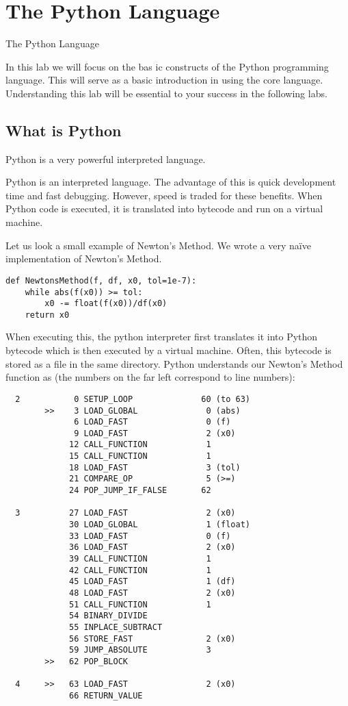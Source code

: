 \chapter{The Python Language}{The Python Language}
\label{Lab:PythonBasic}

In this lab we will focus on the bas ic constructs of the Python programming language.  This will serve as a basic introduction in using the core language.  Understanding this lab will be essential to your success in the following labs.

\section*{What is Python}
Python is a very powerful interpreted language.  

Python is an interpreted language.  The advantage of this is quick development time and fast debugging.  However, speed is traded for these benefits.  When Python code is executed, it is translated into bytecode and run on a virtual machine.

Let us look a small example of Newton's Method.  We wrote a very na\"ive implementation of Newton's Method.
\begin{lstlisting}[style=python]
def NewtonsMethod(f, df, x0, tol=1e-7):
    while abs(f(x0)) >= tol:
        x0 -= float(f(x0))/df(x0)
    return x0
\end{lstlisting}
When executing this, the python interpreter first translates it into Python bytecode which is then executed by a virtual machine.  Often, this bytecode is stored as a  file in the same directory.  Python understands our Newton's Method function as (the numbers on the far left correspond to line numbers):
\begin{verbatim}
  2           0 SETUP_LOOP              60 (to 63)
        >>    3 LOAD_GLOBAL              0 (abs)
              6 LOAD_FAST                0 (f)
              9 LOAD_FAST                2 (x0)
             12 CALL_FUNCTION            1
             15 CALL_FUNCTION            1
             18 LOAD_FAST                3 (tol)
             21 COMPARE_OP               5 (>=)
             24 POP_JUMP_IF_FALSE       62

  3          27 LOAD_FAST                2 (x0)
             30 LOAD_GLOBAL              1 (float)
             33 LOAD_FAST                0 (f)
             36 LOAD_FAST                2 (x0)
             39 CALL_FUNCTION            1
             42 CALL_FUNCTION            1
             45 LOAD_FAST                1 (df)
             48 LOAD_FAST                2 (x0)
             51 CALL_FUNCTION            1
             54 BINARY_DIVIDE       
             55 INPLACE_SUBTRACT    
             56 STORE_FAST               2 (x0)
             59 JUMP_ABSOLUTE            3
        >>   62 POP_BLOCK           

  4     >>   63 LOAD_FAST                2 (x0)
             66 RETURN_VALUE
\end{verbatim}

